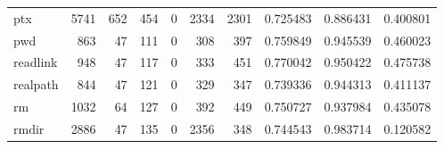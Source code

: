 \begin{longtable}{lrrrrrrrrr}
ptx       &                                               5741 &                                                652 &                                                454 &                                                  0 &                                               2334 &                                               2301 &                                           0.725483 &                               0.886431 &                             0.400801 \\
pwd       &                                                863 &                                                 47 &                                                111 &                                                  0 &                                                308 &                                                397 &                                           0.759849 &                               0.945539 &                             0.460023 \\
readlink  &                                                948 &                                                 47 &                                                117 &                                                  0 &                                                333 &                                                451 &                                           0.770042 &                               0.950422 &                             0.475738 \\
realpath  &                                                844 &                                                 47 &                                                121 &                                                  0 &                                                329 &                                                347 &                                           0.739336 &                               0.944313 &                             0.411137 \\
rm        &                                               1032 &                                                 64 &                                                127 &                                                  0 &                                                392 &                                                449 &                                           0.750727 &                               0.937984 &                             0.435078 \\
rmdir     &                                               2886 &                                                 47 &                                                135 &                                                  0 &                                               2356 &                                                348 &                                           0.744543 &                               0.983714 &                             0.120582 \\

\end{longtable}
